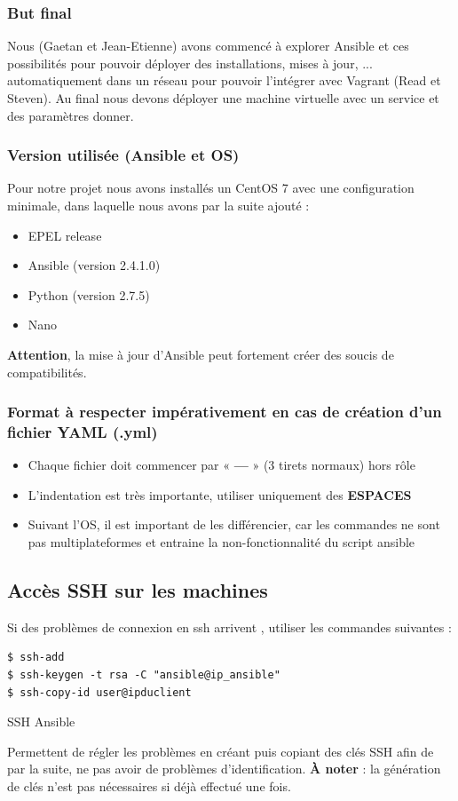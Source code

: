 \documentclass[a4paper, 12pt]{article}
\newenvironment{code}{\captionsetup{type=listing}}{}
\begin{document}
\subsubsection{But final}
Nous (Gaetan et Jean-Etienne) avons commencé à explorer Ansible et ces possibilités pour pouvoir
déployer des installations, mises à jour, ... automatiquement dans un réseau pour pouvoir l'intégrer
avec Vagrant (Read et Steven). Au final nous devons déployer une machine virtuelle avec un service et
des paramètres donner.

\subsubsection{Version utilisée (Ansible et OS)}
Pour notre projet nous avons installés un CentOS 7 avec une configuration minimale, dans laquelle nous avons par la suite ajouté :
\begin{itemize}
    \item EPEL release
    \item Ansible (version 2.4.1.0)
    \item Python (version 2.7.5)
    \item Nano
\end{itemize}
\textbf{Attention}, la mise à jour d'Ansible peut fortement créer des soucis de compatibilités.

\subsubsection{Format à respecter impérativement en cas de création d'un fichier YAML (.yml)}
\begin{itemize}
    \item Chaque fichier doit commencer par  « \textbf{---} » (3 tirets normaux) hors rôle
    \item L'indentation est très importante, utiliser uniquement des \textbf{ESPACES}
    \item Suivant l'OS, il est important de les différencier, car les commandes ne sont pas multiplateformes et entraine la non-fonctionnalité du script ansible
\end{itemize}

\subsection{Accès SSH sur les machines}
Si des problèmes de connexion en ssh arrivent , utiliser les commandes suivantes :
\begin{code}
    \begin{verbatim}
$ ssh-add
$ ssh-keygen -t rsa -C "ansible@ip_ansible"
$ ssh-copy-id user@ipduclient
    \end{verbatim}
    \caption{SSH Ansible}
    \label{ssh_ansible}
\end{code}
\bigbreak
Permettent de régler les problèmes en créant puis copiant des clés SSH afin de par la suite, ne pas avoir de problèmes d'identification.
\textbf{À noter} : la génération de clés n'est pas nécessaires si déjà effectué une fois.
\end{document}

